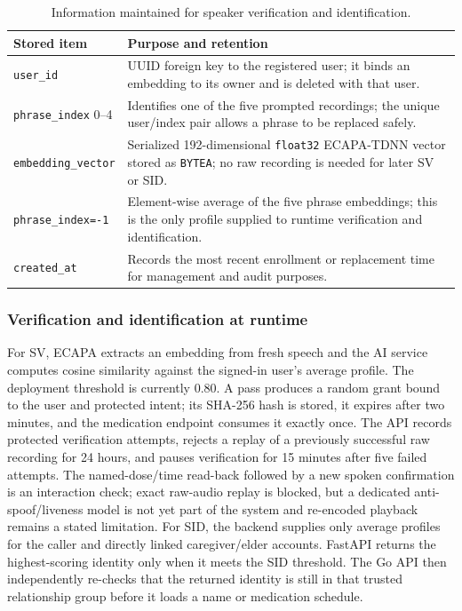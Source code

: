 \begin{table}[H]
\centering
\small
\begin{tabularx}{\textwidth}{>{\raggedright\arraybackslash}p{3.5cm}>{\raggedright\arraybackslash}X}
\toprule
\textbf{Stored item} & \textbf{Purpose and retention} \\
\midrule
\texttt{user\_id} & UUID foreign key to the registered user; it binds an embedding to its owner and is deleted with that user. \\
\texttt{phrase\_index} 0--4 & Identifies one of the five prompted recordings; the unique user/index pair allows a phrase to be replaced safely. \\
\texttt{embedding\_vector} & Serialized 192-dimensional \texttt{float32} ECAPA-TDNN vector stored as \texttt{BYTEA}; no raw recording is needed for later SV or SID. \\
\texttt{phrase\_index=-1} & Element-wise average of the five phrase embeddings; this is the only profile supplied to runtime verification and identification. \\
\texttt{created\_at} & Records the most recent enrollment or replacement time for management and audit purposes. \\
\bottomrule
\end{tabularx}
\caption{Information maintained for speaker verification and identification.}
\label{tab:enrollment-storage}
\end{table}

\subsubsection{Verification and identification at runtime}
For SV, ECAPA extracts an embedding from fresh speech and the AI service computes cosine similarity against the signed-in user's average profile. The deployment threshold is currently 0.80. A pass produces a random grant bound to the user and protected intent; its SHA-256 hash is stored, it expires after two minutes, and the medication endpoint consumes it exactly once. The API records protected verification attempts, rejects a replay of a previously successful raw recording for 24 hours, and pauses verification for 15 minutes after five failed attempts. The named-dose/time read-back followed by a new spoken confirmation is an interaction check; exact raw-audio replay is blocked, but a dedicated anti-spoof/liveness model is not yet part of the system and re-encoded playback remains a stated limitation. For SID, the backend supplies only average profiles for the caller and directly linked caregiver/elder accounts. FastAPI returns the highest-scoring identity only when it meets the SID threshold. The Go API then independently re-checks that the returned identity is still in that trusted relationship group before it loads a name or medication schedule.


